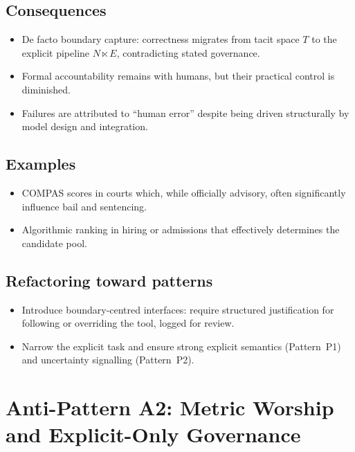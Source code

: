 \subsection*{Consequences}

\begin{itemize}
  \item De facto boundary capture:
        correctness migrates from tacit space \(T\) to the explicit
        pipeline \(N \ltimes E\), contradicting stated governance.
  \item Formal accountability remains with humans, but their practical
        control is diminished.
  \item Failures are attributed to ``human error'' despite being driven
        structurally by model design and integration.
\end{itemize}

\subsection*{Examples}

\begin{itemize}
  \item COMPAS scores in courts which, while officially advisory, often
        significantly influence bail and sentencing.
  \item Algorithmic ranking in hiring or admissions that effectively
        determines the candidate pool.
\end{itemize}

\subsection*{Refactoring toward patterns}

\begin{itemize}
  \item Introduce boundary-centred interfaces:
        require structured justification for following or overriding
        the tool, logged for review.
  \item Narrow the explicit task and ensure strong explicit semantics
        (Pattern~P1) and uncertainty signalling (Pattern~P2).
\end{itemize}

\section{Anti-Pattern A2: Metric Worship and Explicit-Only Governance}
\label{antipattern:a2}


